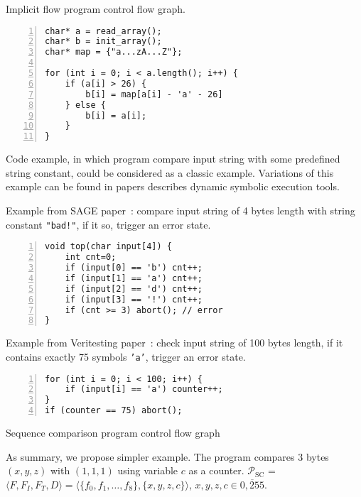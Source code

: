     {Implicit flow program control flow graph.}




\begin{lstlisting}[numbers=left,numberstyle=\scriptsize]
char* a = read_array();
char* b = init_array();
char* map = {"a...zA...Z"};

for (int i = 0; i < a.length(); i++) {
    if (a[i] > 26) {
        b[i] = map[a[i] - 'a' - 26]
    } else {
        b[i] = a[i];
    }
}
\end{lstlisting}



Code example, in which program compare input string with some
predefined string constant, could be considered as a classic example.
Variations of this example can be found in papers describes
dynamic symbolic execution tools.

Example from SAGE paper~\cite{sage}: compare input string of 4 bytes length
with string constant \texttt{"bad!"}, if it so, trigger an error state.
\begin{lstlisting}[numbers=left,numberstyle=\scriptsize]
void top(char input[4]) {
    int cnt=0;
    if (input[0] == 'b') cnt++;
    if (input[1] == 'a') cnt++;
    if (input[2] == 'd') cnt++;
    if (input[3] == '!') cnt++;
    if (cnt >= 3) abort(); // error
}
\end{lstlisting}

Example from Veritesting paper~\cite{veritesting}: check input string of
100 bytes length, if it contains exactly 75 symbols \texttt{'a'},
trigger an error state.
\begin{lstlisting}[numbers=left,numberstyle=\scriptsize]
for (int i = 0; i < 100; i++) {
    if (input[i] == 'a') counter++;
}
if (counter == 75) abort();
\end{lstlisting}

    {Sequence comparison program control flow graph}

As summary, we propose simpler example.
The program compares 3 bytes $(x, y, z)$ with $(1, 1, 1)$ using
variable $c$ as a counter.
$\mathcal{P}_{\text{SC}}$ = $\langle F, F_I, F_T, D \rangle =
    \langle \{f_0, f_1, \dots, f_8\},
    \{x, y, z, c\} \rangle$,
$x, y, z, c \in \overline{0, 255}$.

